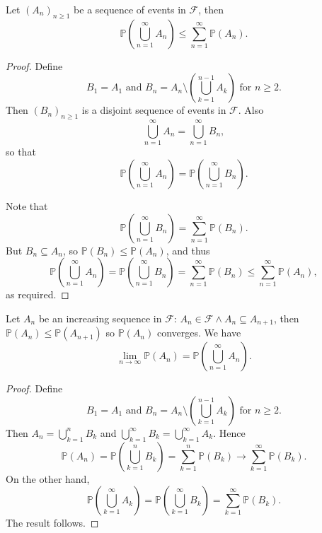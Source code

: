\begin{proposition}\label{prop:Countable subadditivity}
    Let $ (A_n)_{n\ge 1} $ be a sequence of events in $ \mathscr{F} $, then 
\[
    \mathbb{P}\left( \bigcup_{n=1}^{\infty}A_n \right)\le \sum_{n=1}^{\infty}\mathbb{P}(A_n).
\]
\end{proposition}
\begin{proof}
    Define 
    \[
        B_1=A_1 \text{ and } B_n = A_n \setminus \left( \bigcup_{k=1}^{n-1}A_k \right)\text{ for }n\ge 2.
    \]
    Then $ (B_n)_{n\ge 1} $ is a disjoint sequence of events in $ \mathscr{F} $. Also
    \[
        \bigcup_{n=1}^{\infty}A_n=\bigcup_{n=1}^{\infty}B_n,
    \]
    so that
    \[
        \mathbb{P}\left( \bigcup_{n=1}^{\infty}A_n \right) = \mathbb{P}\left( \bigcup_{n=1}^{\infty}B_n \right).
    \]
    
    Note that 
    \[
        \mathbb{P}\left( \bigcup_{n=1}^{\infty}B_n \right) = \sum_{n=1}^{\infty}\mathbb{P}(B_n).
    \]
    But $ B_n \subseteq A_n $, so $ \mathbb{P}(B_n)\le \mathbb{P}(A_n) $, and thus 
    \[
        \mathbb{P}\left( \bigcup_{n=1}^{\infty}A_n \right) = \mathbb{P}\left( \bigcup_{n=1}^{\infty}B_n \right)=\sum_{n=1}^{\infty}\mathbb{P}(B_n)\le \sum_{n=1}^{\infty}\mathbb{P}(A_n),
    \]
    as required.
\end{proof}

\begin{proposition}[Continuity]\label{prop:continuity}
    Let $A_n$ be an increasing sequence in $ \mathscr{F} $: $ A_{n}\in \mathscr{F} \land A_n \subseteq A_{n+1} $, then $ \mathbb{P}(A_n) \le \mathbb{P}(A_{n+1}) $ so $ \mathbb{P}(A_n) $ converges. We have
    \[
        \lim_{n \to \infty} \mathbb{P}(A_n) = \mathbb{P}\left( \bigcup_{n=1}^{\infty}A_n \right).
    \]
\end{proposition}
\begin{proof}
    Define 
    \[
        B_1=A_1 \text{ and } B_n = A_n \setminus \left( \bigcup_{k=1}^{n-1}A_k \right)\text{ for }n\ge 2.
    \]
    Then $ A_n = \bigcup_{k=1}^{n}B_k $ and $ \bigcup_{k=1}^{\infty}B_k= \bigcup_{k=1}^{\infty}A_k$. Hence 
    \[
        \mathbb{P}(A_n) = \mathbb{P}\left( \bigcup_{k=1}^{n}B_k \right) = \sum_{k=1}^{n}\mathbb{P}(B_k)\to \sum_{k=1}^{\infty}\mathbb{P}(B_k).
    \]
    On the other hand,
    \[
        \mathbb{P}\left( \bigcup_{k=1}^{\infty}A_k \right)=\mathbb{P}\left( \bigcup_{k=1}^{\infty}B_k \right) = \sum_{k=1}^{\infty}\mathbb{P}(B_k).
    \]
    The result follows.
\end{proof}

